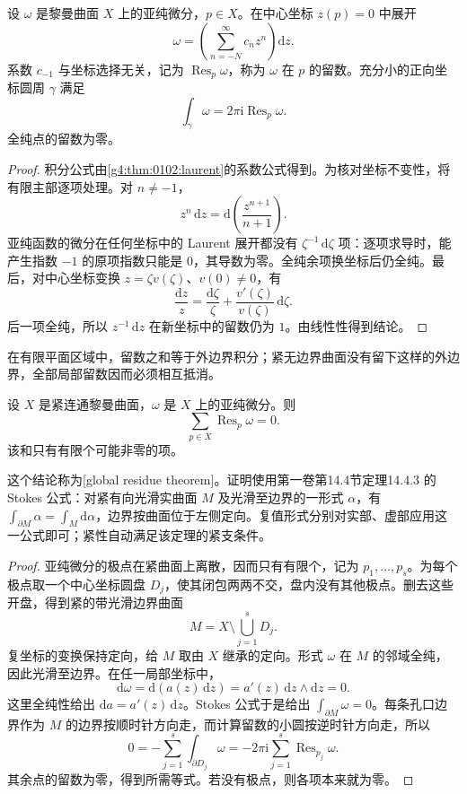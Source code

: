 \begin{proposition}
	\label{g4:prop:0203:residue-invariance}
	设 \(\omega\) 是黎曼曲面 \(X\) 上的亚纯微分，\(p\in X\)。在中心坐标 \(z(p)=0\) 中展开
	\[
		\omega=\left(\sum_{n=-N}^{\infty}c_nz^n\right)\mathrm{d}z.
	\]
	系数 \(c_{-1}\) 与坐标选择无关，记为 \(\operatorname{Res}_p\omega\)，称为 \(\omega\) 在 \(p\) 的留数。充分小的正向坐标圆周 \(\gamma\) 满足
	\[
		\int_\gamma\omega=2\pi\mathrm{i}\operatorname{Res}_p\omega.
	\]
	全纯点的留数为零。
\end{proposition}

\begin{proof}
	积分公式由\cref{g4:thm:0102:laurent}的系数公式得到。为核对坐标不变性，将有限主部逐项处理。对 \(n\ne-1\)，
	\[
		z^n\,\mathrm{d}z=\mathrm{d}\left(\frac{z^{n+1}}{n+1}\right).
	\]
	亚纯函数的微分在任何坐标中的 Laurent 展开都没有 \(\zeta^{-1}\,\mathrm{d}\zeta\) 项：逐项求导时，能产生指数 \(-1\) 的原项指数只能是 \(0\)，其导数为零。全纯余项换坐标后仍全纯。最后，对中心坐标变换 \(z=\zeta v(\zeta)\)、\(v(0)\ne0\)，有
	\[
		\frac{\mathrm{d}z}{z}
		=\frac{\mathrm{d}\zeta}{\zeta}
		+\frac{v'(\zeta)}{v(\zeta)}\,\mathrm{d}\zeta.
	\]
	后一项全纯，所以 \(z^{-1}\,\mathrm{d}z\) 在新坐标中的留数仍为 \(1\)。由线性性得到结论。
\end{proof}

在有限平面区域中，留数之和等于外边界积分；紧无边界曲面没有留下这样的外边界，全部局部留数因而必须相互抵消。

\begin{theorem}[整体留数定理]
	\label{g4:thm:0203:global-residue}
	设 \(X\) 是紧连通黎曼曲面，\(\omega\) 是 \(X\) 上的亚纯微分。则
	\[
		\sum_{p\in X}\operatorname{Res}_p\omega=0.
	\]
	该和只有有限个可能非零的项。
\end{theorem}

这个结论称为[global residue theorem]。证明使用第一卷第14.4节定理14.4.3 的 Stokes 公式：对紧有向光滑实曲面 \(M\) 及光滑至边界的一形式 \(\alpha\)，有 \(\int_{\partial M}\alpha=\int_M\mathrm{d}\alpha\)，边界按曲面位于左侧定向。复值形式分别对实部、虚部应用这一公式即可；紧性自动满足该定理的紧支条件。

\begin{proof}
	亚纯微分的极点在紧曲面上离散，因而只有有限个，记为 \(p_1,\ldots,p_s\)。为每个极点取一个中心坐标圆盘 \(D_j\)，使其闭包两两不交，盘内没有其他极点。删去这些开盘，得到紧的带光滑边界曲面
	\[
		M=X\setminus\bigcup_{j=1}^s D_j.
	\]
	复坐标的变换保持定向，给 \(M\) 取由 \(X\) 继承的定向。形式 \(\omega\) 在 \(M\) 的邻域全纯，因此光滑至边界。在任一局部坐标中，
	\[
		\mathrm{d}\omega
		=\mathrm{d}(a(z)\,\mathrm{d}z)
		=a'(z)\,\mathrm{d}z\wedge\mathrm{d}z=0.
	\]
	这里全纯性给出 \(\mathrm{d}a=a'(z)\,\mathrm{d}z\)。Stokes 公式于是给出 \(\int_{\partial M}\omega=0\)。每条孔口边界作为 \(M\) 的边界按顺时针方向走，而计算留数的小圆按逆时针方向走，所以
	\[
		0=-\sum_{j=1}^s\int_{\partial D_j}\omega
		=-2\pi\mathrm{i}\sum_{j=1}^s\operatorname{Res}_{p_j}\omega.
	\]
	其余点的留数为零，得到所需等式。若没有极点，则各项本来就为零。
\end{proof}

